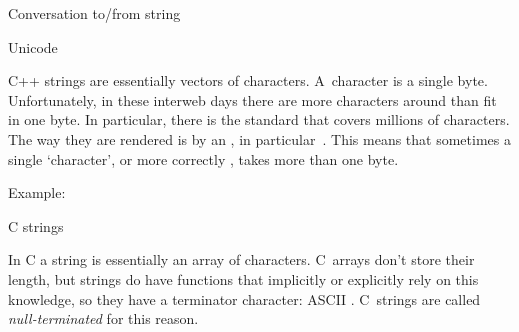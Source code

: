  {Conversation to/from string}


 {Unicode}

C++ strings are essentially vectors of characters. A~character is a
single byte. Unfortunately, in these interweb days there are more
characters around than fit in one byte. In particular, there is the
 standard that covers millions of
characters. The way they are rendered is by an
, in
particular~. This means that sometimes a single
`character', or more correctly , takes more than
one byte.

Example:

 {C strings}
\label{sec:cstring}

In C a string is essentially an array of characters. C~arrays don't
store their length, but strings do have functions that implicitly or
explicitly rely on this knowledge, so they have a terminator
character: ASCII . C~strings are called
\emph{null-terminated} for this reason.

